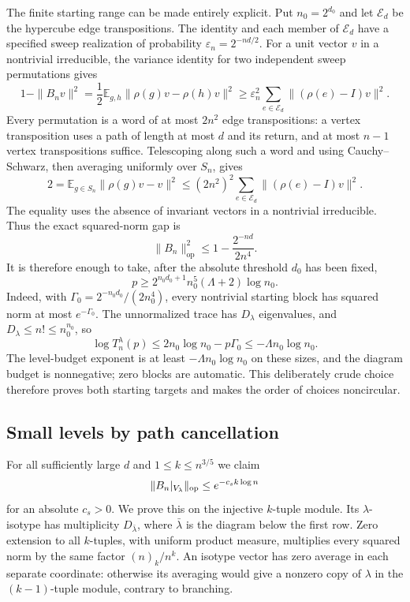 The finite starting range can be made entirely explicit.  Put
$n_0=2^{d_0}$ and let $\mathcal E_d$ be the hypercube edge
transpositions.  The identity and each member of $\mathcal E_d$ have
a specified sweep realization of probability $\varepsilon_n=2^{-nd/2}$.
For a unit vector $v$ in a nontrivial irreducible, the variance identity
for two independent sweep permutations gives
\[
 1-\|B_nv\|^2
 =\frac12\mathbb E_{g,h}\|\rho(g)v-\rho(h)v\|^2
 \ge\varepsilon_n^2\sum_{e\in\mathcal E_d}
       \|(\rho(e)-I)v\|^2.
\]
Every permutation is a word of at most $2n^2$ edge transpositions:
a vertex transposition uses a path of length at most $d$ and its return,
and at most $n-1$ vertex transpositions suffice.  Telescoping along such
a word and using Cauchy--Schwarz, then averaging uniformly over $S_n$,
gives
\[
 2=\mathbb E_{g\in S_n}\|\rho(g)v-v\|^2
 \le(2n^2)^2\sum_{e\in\mathcal E_d}\|(\rho(e)-I)v\|^2.
\]
The equality uses the absence of invariant vectors in a nontrivial
irreducible.  Thus the exact squared-norm gap is
\[
 \|B_n\|_{\mathrm{op}}^2\le1-\frac{2^{-nd}}{2n^4}.
\]
It is therefore enough to take, after the absolute threshold $d_0$
has been fixed,
\begin{equation}\label{rec:hybrid-explicit-base}
 p\ge2^{n_0d_0+1}n_0^5(\Lambda+2)\log n_0.
\end{equation}
Indeed, with $\Gamma_0=2^{-n_0d_0}/(2n_0^4)$, every nontrivial
starting block has squared norm at most $e^{-\Gamma_0}$.  The
unnormalized trace has $D_\lambda$ eigenvalues, and
$D_\lambda\le n!\le n_0^{n_0}$, so
\[
 \log T_n^\lambda(p)\le2n_0\log n_0-p\Gamma_0
 \le-\Lambda n_0\log n_0.
\]
The level-budget exponent is at least $-\Lambda n_0\log n_0$ on
these sizes, and the diagram budget is nonnegative; zero blocks are
automatic.  This deliberately crude choice therefore proves both
starting targets and makes the order of choices noncircular.

\subsection{Small levels by path cancellation}

For all sufficiently large $d$ and $1\le k\le n^{3/5}$ we claim
\begin{equation}\label{rec:hybrid-sparse}
 \|B_n|_{V_\lambda}\|_{\mathrm{op}}\le e^{-c_s k\log n}
\end{equation}
for an absolute $c_s>0$. We prove this on the injective $k$-tuple
module. Its $\lambda$-isotype has multiplicity
$D_{\bar\lambda}$, where $\bar\lambda$ is the diagram below the
first row. Zero extension to all $k$-tuples, with uniform product
measure, multiplies every squared norm by the same factor
$(n)_k/n^k$. An isotype vector has zero average in each separate
coordinate: otherwise its averaging would give a nonzero copy of
$\lambda$ in the $(k-1)$-tuple module, contrary to branching.

